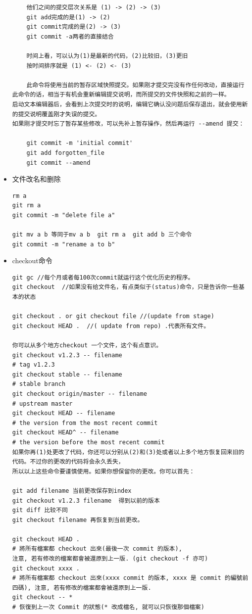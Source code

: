 \documentclass[a4paper,12pt,twoside]{book}
\begin{document}
\begin{CJK*}{UTF8}{song}
\begin{itemize}
\begin{verbatim}
    他们之间的提交层次关系是 (1) -> (2) -> (3)
    git add完成的是(1) -> (2)
    git commit完成的是(2) -> (3)
    git commit -a两者的直接结合

    时间上看，可以认为(1)是最新的代码，(2)比较旧，(3)更旧
    按时间排序就是 (1) <- (2) <- (3)

    此命令将使用当前的暂存区域快照提交。如果刚才提交完没有作任何改动，直接运行此命令的话，相当于有机会重新编辑提交说明，而所提交的文件快照和之前的一样。
启动文本编辑器后，会看到上次提交时的说明，编辑它确认没问题后保存退出，就会使用新的提交说明覆盖刚才失误的提交。
如果刚才提交时忘了暂存某些修改，可以先补上暂存操作，然后再运行 --amend 提交：

    git commit -m 'initial commit'
    git add forgotten_file
    git commit --amend
    \end{verbatim}

\item 文件改名和删除
\begin{verbatim}
rm a
git rm a
git commit -m "delete file a"

git mv a b 等同于mv a b  git rm a  git add b 三个命令
git commit -m "rename a to b"
\end{verbatim}
\item checkout命令
        \begin{verbatim}
git gc //每个月或者每100次commit就运行这个优化历史的程序。
git checkout  //如果没有给文件名，有点类似于(status)命令，只是告诉你一些基本的状态

git checkout . or git checkout file //(update from stage)
git checkout HEAD .  //( update from repo) .代表所有文件。

你可以从多个地方checkout 一个文件，这个有点意识。
git checkout v1.2.3 -- filename
# tag v1.2.3
git checkout stable -- filename
# stable branch
git checkout origin/master -- filename
# upstream master
git checkout HEAD -- filename
# the version from the most recent commit
git checkout HEAD^ -- filename
# the version before the most recent commit
如果你再(1)处更改了代码，你还可以分别从(2)和(3)处或者以上多个地方恢复回来旧的代码。不过你的更改的代码将会永久丢失，
所以以上这些命令要谨慎使用。如果你想保留你的更改。你可以首先：

git add filename 当前更改保存到index
git checkout v1.2.3 filename  得到以前的版本
git diff 比较不同
git checkout filename 再恢复到当前更改。

git checkout HEAD .
# 將所有檔案都 checkout 出來(最後一次 commit 的版本),
注意, 若有修改的檔案都會被還原到上一版. (git checkout -f 亦可)
git checkout xxxx .
# 將所有檔案都 checkout 出來(xxxx commit 的版本, xxxx 是 commit 的編號前四碼), 注意, 若有修改的檔案都會被還原到上一版.
git checkout -- *
# 恢復到上一次 Commit 的狀態(* 改成檔名, 就可以只恢復那個檔案)


\end{verbatim}
\end{itemize}
\end{CJK*}
\end{document}
